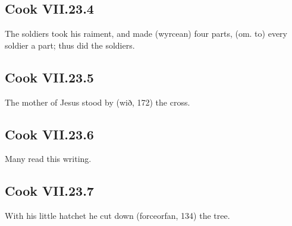 \par\begin{minipage}{\linewidth}\raggedright
\subsection*{Cook VII.23.4}

The soldiers took his raiment, and made (wyrcean) four parts, (om. to) every soldier a part; thus did the soldiers.

\end{minipage}\par\addvspace{4pt}

\par\begin{minipage}{\linewidth}\raggedright
\subsection*{Cook VII.23.5}

The mother of Jesus stood by (wið, 172) the cross.

\end{minipage}\par\addvspace{4pt}

\par\begin{minipage}{\linewidth}\raggedright
\subsection*{Cook VII.23.6}

Many read this writing.

\end{minipage}\par\addvspace{4pt}

\par\begin{minipage}{\linewidth}\raggedright
\subsection*{Cook VII.23.7}

With his little hatchet he cut down (forceorfan, 134) the tree.

\end{minipage}\par\addvspace{4pt}

